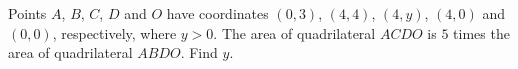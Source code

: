 Points $A$, $B$, $C$, $D$ and $O$ have coordinates $(0,3)$, $(4,4)$, $(4,y)$, $(4,0)$ and $(0,0)$, respectively, where $y>0$. The area of quadrilateral $ACDO$ is $5$ times the area of quadrilateral $ABDO$. Find $y$.
